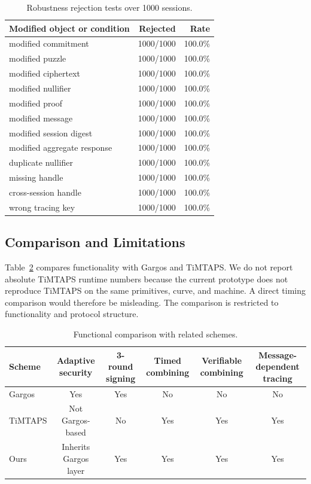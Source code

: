 \begin{table}[t]
\centering
\caption{Robustness rejection tests over 1000 sessions.}
\label{tab:robustness-rejection}
\small
\begin{tabular}{lrr}
\toprule
Modified object or condition & Rejected & Rate \\
\midrule
modified commitment & 1000/1000 & 100.0\% \\
modified puzzle & 1000/1000 & 100.0\% \\
modified ciphertext & 1000/1000 & 100.0\% \\
modified nullifier & 1000/1000 & 100.0\% \\
modified proof & 1000/1000 & 100.0\% \\
modified message & 1000/1000 & 100.0\% \\
modified session digest & 1000/1000 & 100.0\% \\
modified aggregate response & 1000/1000 & 100.0\% \\
duplicate nullifier & 1000/1000 & 100.0\% \\
missing handle & 1000/1000 & 100.0\% \\
cross-session handle & 1000/1000 & 100.0\% \\
wrong tracing key & 1000/1000 & 100.0\% \\
\bottomrule
\end{tabular}
\end{table}

\subsection{Comparison and Limitations}

Table~\ref{tab:functional-comparison} compares functionality with Gargos and
TiMTAPS.  We do not report absolute TiMTAPS runtime numbers because the current
prototype does not reproduce TiMTAPS on the same primitives, curve, and machine.
A direct timing comparison would therefore be misleading.  The comparison is
restricted to functionality and protocol structure.

\begin{table}[t]
\centering
\caption{Functional comparison with related schemes.}
\label{tab:functional-comparison}
\small
\begin{tabular}{lccccc}
\toprule
Scheme & Adaptive security & 3-round signing & Timed combining & Verifiable combining & Message-dependent tracing \\
\midrule
Gargos & Yes & Yes & No & No & No \\
TiMTAPS & Not Gargos-based & No & Yes & Yes & Yes \\
Ours & Inherits Gargos layer & Yes & Yes & Yes & Yes \\
\bottomrule
\end{tabular}
\end{table}


